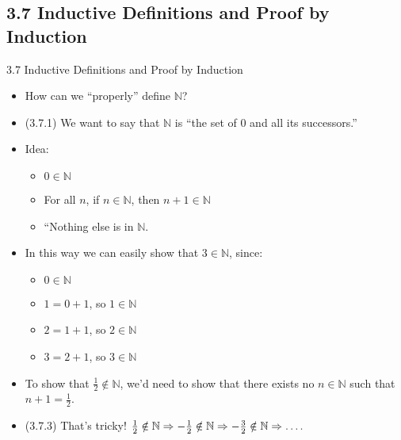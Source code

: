 \subsection{3.7 Inductive Definitions and Proof by Induction}
\begin{frame}{3.7 Inductive Definitions and Proof by Induction}

	\begin{itemize}
	
		\item How can we ``properly'' define $\mathbb{N}$?
		
		\item (3.7.1) We want to say that $\mathbb{N}$ is ``the set of 0 and all its successors.''
		
		\item Idea:
		
		\begin{itemize}
		
			\item $0\in\mathbb{N}$
			
			\item For all $n$, if $n\in\mathbb{N}$, then $n+1\in\mathbb{N}$
			
			\item ``Nothing else is in $\mathbb{N}$.
		
		\end{itemize}
	
		\item In this way we can easily show that $3\in\mathbb{N}$, since:
		
		\begin{itemize}
		
			\item $0\in\mathbb{N}$
			
			\item $1=0+1$, so $1\in\mathbb{N}$
			\item $2=1+1$, so $2\in\mathbb{N}$
			\item $3=2+1$, so $3\in\mathbb{N}$
			
		\end{itemize}
		
		\item To show that $\frac{1}{2}\notin \mathbb{N}$, we'd need to show that there exists no $n\in\mathbb{N}$ such that $n+1=\frac{1}{2}$.
		
		\item (3.7.3) That's tricky! $\frac{1}{2}\notin \mathbb{N}\Rightarrow -\frac{1}{2}\notin\mathbb{N}\Rightarrow -\frac{3}{2}\notin\mathbb{N}\Rightarrow\mathellipsis.$
	
	\end{itemize}

\end{frame}


